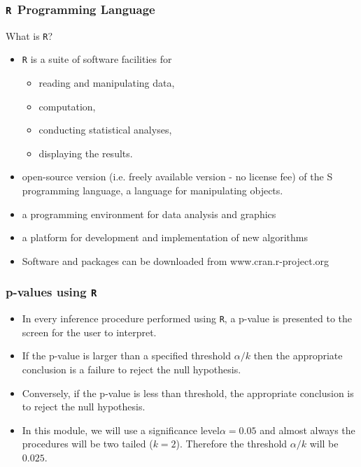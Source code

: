 \documentclass[a4]{beamer}
\begin{document}


\begin{frame}
\frametitle{\texttt{R }Programming Language}
What is \texttt{R}?

\begin{itemize}
\item \texttt{R} is a suite of software facilities for
\begin{itemize}
\item reading and manipulating data,
\item computation,
\item conducting statistical analyses,
\item displaying the results.
\end{itemize}
\item open-source version (i.e. freely available version - no license
fee) of the S programming language, a language for
manipulating objects.

\item a programming environment for data analysis and graphics
\item a platform for development and implementation of new
algorithms
\item Software and packages can be downloaded from
www.cran.r-project.org
\end{itemize}
\end{frame}
\begin{frame}
\frametitle{p-values using \texttt{R}}
\begin{itemize}
\item In every inference procedure performed using \texttt{R}, a p-value is presented to the screen for the user to interpret.

\item If the p-value is larger than a specified threshold $\alpha/k$ then the appropriate conclusion is a
failure to reject the null hypothesis.

\item Conversely, if the p-value is less than threshold, the appropriate conclusion is to reject the null hypothesis.

\item In this module, we will use a significance level$\alpha=0.05$ and almost always the procedures will be two tailed ($k=2$). Therefore the threshold $\alpha/k$ will be $0.025$.
\end{itemize}
\end{frame}
\end{document}
